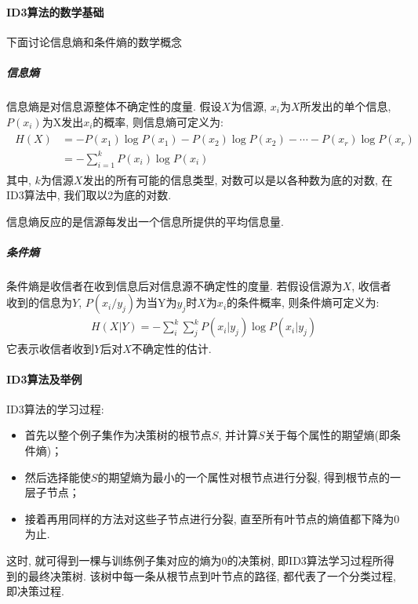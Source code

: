 \paragraph{ID3算法的数学基础}
下面讨论信息熵和条件熵的数学概念
\subparagraph{信息熵}
信息熵是对信息源整体不确定性的度量. 假设$X$为信源, $x_i$为$X$所发出的单个信息, $P(x_i)$为X发出$x_i$的概率, 则信息熵可定义为:
\begin{align}
  \begin{aligned}
  H(X) &=-P\left(x_{1}\right) \log P\left(x_{1}\right)-P\left(x_{2}\right) \log P\left(x_{2}\right)-\cdots-P\left(x_{r}\right) \log P\left(x_{r}\right) \\
                       &=-\sum_{i=1}^{k} P\left(x_{i}\right) \log P\left(x_{i}\right)
  \end{aligned}
\end{align}
其中, $k$为信源$X$发出的所有可能的信息类型, 对数可以是以各种数为底的对数, 在ID3算法中, 我们取以2为底的对数.
\begin{remark}
 信息熵反应的是信源每发出一个信息所提供的平均信息量.
\end{remark}
\subparagraph{条件熵}
条件熵是收信者在收到信息后对信息源不确定性的度量. 若假设信源为$X$, 收信者收到的信息为$Y$,  $P(x_i/y_j)$为当Y为$y_j$时$X$为$x_i$的条件概率, 则条件熵可定义为:
\begin{align}
  H(X | Y)=-\sum_{i}^{k} \sum_{j}^{k} P\left(x_{i} | y_{j}\right) \log P\left(x_{i} | y_{j}\right)
\end{align}
它表示收信者收到$Y$后对$X$不确定性的估计.

\paragraph{ID3算法及举例}
ID3算法的学习过程:
\begin{itemize}
\item 首先以整个例子集作为决策树的根节点$S$, 并计算$S$关于每个属性的期望熵(即条件熵)；
\item 然后选择能使$S$的期望熵为最小的一个属性对根节点进行分裂, 得到根节点的一层子节点；
\item 接着再用同样的方法对这些子节点进行分裂, 直至所有叶节点的熵值都下降为0为止.
\end{itemize}
这时, 就可得到一棵与训练例子集对应的熵为0的决策树, 即ID3算法学习过程所得到的最终决策树. 该树中每一条从根节点到叶节点的路径, 都代表了一个分类过程, 即决策过程.

